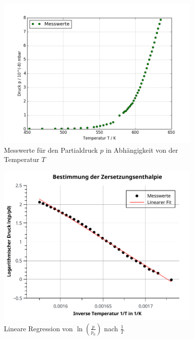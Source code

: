 \begin{figure}[tb]
	\centering\includegraphics[width=0.9\textwidth]{fig/massen_a6_1.png}
	\caption{Messwerte für den Partialdruck $p$ in Abhängigkeit von der Temperatur $T$}
	\label{fig:v61}
\end{figure}

\begin{figure}[tb]
	\centering\includegraphics[width=0.9\textwidth]{fig/massen_a6_reg.pdf}
	\caption{Lineare Regression von $\ln\left(\frac{p}{p_{0}}\right)$ nach $\frac{1}{T}$}
	\label{fig:v62}
\end{figure}


%
%
%

